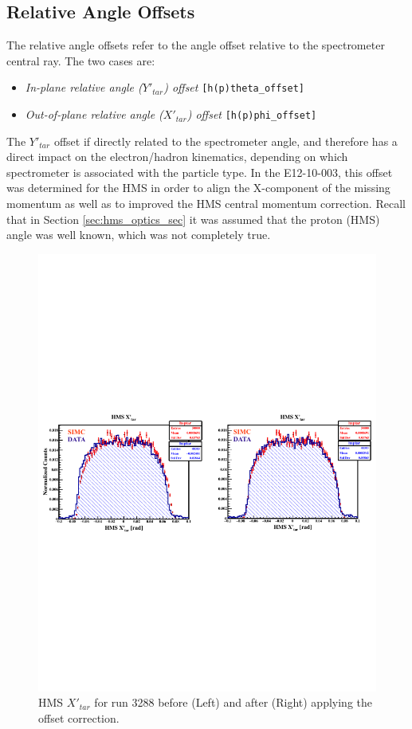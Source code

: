 \documentclass[11pt]{article}
\begin{document}
\subsection{Relative Angle Offsets}
The relative angle offsets refer to the angle offset relative to the spectrometer central ray. The two cases are:
\begin{itemize}
\item \textit{In-plane relative angle ($Y'_{tar}$) offset} \texttt{[h(p)theta\_offset]}
\item \textit{Out-of-plane relative angle ($X'_{tar}$) offset} \texttt{[h(p)phi\_offset]}
\end{itemize}
The $Y'_{tar}$ offset if directly related to the spectrometer angle, and therefore has a direct impact on the electron/hadron kinematics, depending on which
spectrometer is associated with the particle type. In the E12-10-003, this offset was determined for the HMS in order to align the X-component of the missing
momentum as well as to improved the HMS central momentum correction. Recall that in Section \ref{sec:hms_optics_sec} it was assumed that the proton (HMS) angle
was well known, which was not completely true. 
\begin{figure}[h!]
  \centering
  \includegraphics[scale=0.8]{plots/hxptar_offset_3288.pdf}
  \caption{HMS $X'_{tar}$ for run 3288 before (Left) and after (Right) applying the offset correction.}
  \label{fig:hxptar_Offset}
\end{figure} \\
\end{document}
